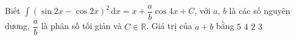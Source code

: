\begin{ex}%
    Biết $\displaystyle\int {\left(\sin 2x-\cos 2x\right)}^2 \mathrm{\,d}x=x+\dfrac{a}{b}\cos 4x+C$, với $a$, $b$ là các số nguyên dương, $\dfrac{a}{b}$ là phân số tối giản và $C\in \mathbb{R}$. Giá trị của $a+b$ bằng
    \choice
    {\True $5$}
    {$4$}
    {$2$}
    {$3$}
\end{ex}

